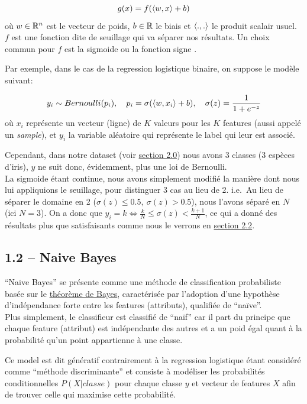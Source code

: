 \documentclass[
]{article}
\begin{document}
\[
g(x) = f(\langle w, x \rangle + b)
\] où \(w \in \mathbb{R}^n\) est le vecteur de poids, \(b \in \mathbb{R}\) le biais et
\(\langle ., . \rangle\) le produit scalair usuel. \(f\) est une fonction
dite de seuillage qui va séparer nos résultats. Un choix commun pour
\(f\) est la sigmoide ou la fonction signe
\cite{ClassifieurLineaire2022}.

Par exemple, dans le cas de la regression logistique binaire, on suppose
le modèle suivant:

\[
y_i \sim Bernoulli(p_i),\quad p_i = \sigma(\langle w, x_i \rangle + b),\quad \sigma(z) = \frac{1}{1 + e^{-z}}
\] où \(x_i\) représente un vecteur (ligne) de \(K\) valeurs pour les
\(K\) features (aussi appelé un \emph{sample}), et \(y_i\) la variable
aléatoire qui représente le label qui leur est associé.

Cependant, dans notre dataset (voir
\href{#choix-du-dataset-outils-utilisuxe9s}{section 2.0}) nous avons 3
classes (3 espèces d'iris), \(y\) ne suit donc, évidemment, plus une loi
de Bernoulli.\\
La sigmoide étant continue, nous avons simplement modifié la manière
dont nous lui appliquions le seuillage, pour distinguer 3 cas au lieu de
2. i.e.~Au lieu de séparer le domaine en 2
(\(\sigma(z) \leq 0.5,\ \sigma(z) > 0.5\)), nous l'avons séparé en \(N\)
(ici \(N = 3\)). On a donc que
\(y_i = k \Leftrightarrow \frac{k}{N} \leq \sigma(z) < \frac{k + 1}{N}\),
ce qui a donné des résultats plus que satisfaisants comme nous le
verrons en \href{#ruxe9gression-logistique-1}{section 2.2}.

\hypertarget{naive-bayes}{%
\subsection{1.2 -- Naive Bayes}\label{naive-bayes}}

``Naive Bayes'' se présente comme une méthode de classification
probabiliste basée sur le
\href{https://en.wikipedia.org/wiki/Bayes\%27_theorem}{théorème de
Bayes}, caractérisée par l'adoption d'une hypothèse d'indépendance forte
entre les features (attributs), qualifiée de ``naïve''.\\
Plus simplement, le classifieur est classifié de ``naïf'' car il part du
principe que chaque feature (attribut) est indépendante des autres et a
un poid égal quant à la probabilité qu'un point appartienne à une
classe.

Ce model est dit génératif contrairement à la regression logistique
étant considéré comme ``méthode discriminante''
\cite{ClassifieurLineaire2022} et consiste à modéliser les probabilités
conditionnelles \(P(X | classe)\) pour chaque classe \(y\) et vecteur de
features \(X\) afin de trouver celle qui maximise cette probabilité.
\end{document}
